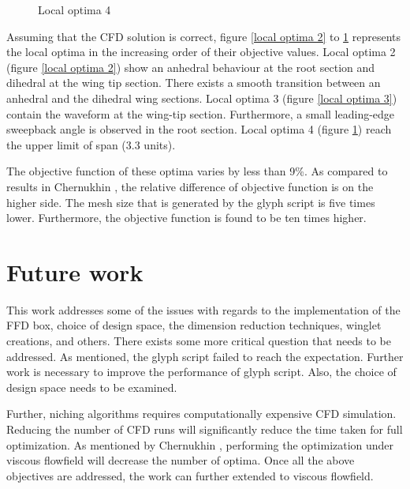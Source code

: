 \begin{figure}
    \centering
    \caption{Local optima 4}
    \label{local optima 4}
\end{figure}

Assuming that the CFD solution is correct, figure \ref{local optima 2} to \ref{local optima 4} represents the local optima in the increasing order of their objective values. Local optima 2 (figure \ref{local optima 2}) show an anhedral behaviour at the root section and dihedral at the wing tip section. There exists a smooth transition between an anhedral and the dihedral wing sections. Local optima 3 (figure \ref{local optima 3}) contain the waveform at the wing-tip section. Furthermore, a small leading-edge sweepback angle is observed in the root section. Local optima 4 (figure \ref{local optima 4}) reach the upper limit of span (3.3 units). 

The objective function of these optima varies by less than 9\%. As compared to results in Chernukhin \cite{oleg:phd}, the relative difference of objective function is on the higher side. The mesh size that is generated by the glyph script is five times lower. Furthermore, the objective function is found to be ten times higher.

\section{Future work}
This work addresses some of the issues with regards to the implementation of the FFD box, choice of design space, the dimension reduction techniques, winglet creations, and others. There exists some more critical question that needs to be addressed. As mentioned, the glyph script failed to reach the expectation. Further work is necessary to improve the performance of glyph script. Also, the choice of design space needs to be examined.

Further, niching algorithms requires computationally expensive CFD simulation. Reducing the number of CFD runs will significantly reduce the time taken for full optimization. As mentioned by Chernukhin \cite{oleg:phd}, performing the optimization under viscous flowfield will decrease the number of optima. Once all the above objectives are addressed, the work can further extended to viscous flowfield. 
